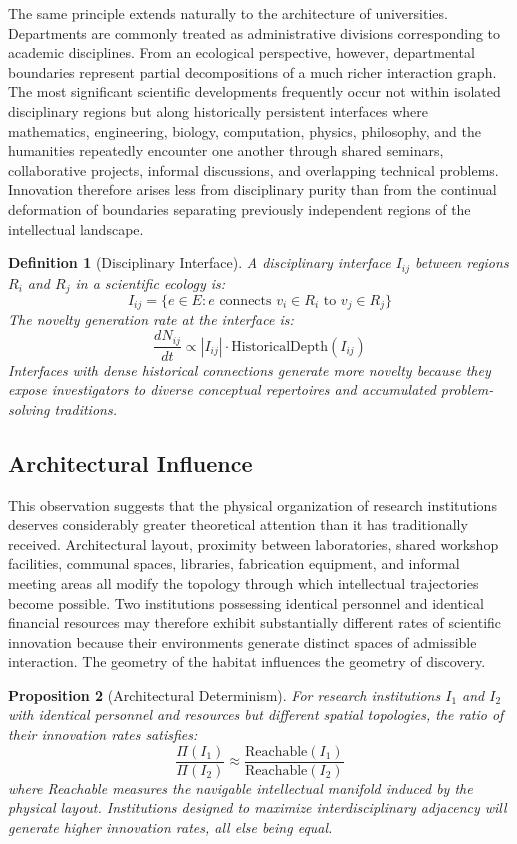 \documentclass[12pt,oneside]{article}
\newtheorem{definition}{Definition}[section]
\newtheorem{proposition}[definition]{Proposition}
\theoremstyle{remark}
\begin{document}
The same principle extends naturally to the architecture of universities. Departments are commonly treated as administrative divisions corresponding to academic disciplines. From an ecological perspective, however, departmental boundaries represent partial decompositions of a much richer interaction graph. The most significant scientific developments frequently occur not within isolated disciplinary regions but along historically persistent interfaces where mathematics, engineering, biology, computation, physics, philosophy, and the humanities repeatedly encounter one another through shared seminars, collaborative projects, informal discussions, and overlapping technical problems. Innovation therefore arises less from disciplinary purity than from the continual deformation of boundaries separating previously independent regions of the intellectual landscape.

\begin{definition}[Disciplinary Interface]
A disciplinary interface \(I_{ij}\) between regions \(R_i\) and \(R_j\) in a scientific ecology is:
\[
I_{ij} = \{e \in E : e \text{ connects } v_i \in R_i \text{ to } v_j \in R_j\}
\]
The novelty generation rate at the interface is:
\[
\frac{dN_{ij}}{dt} \propto |I_{ij}| \cdot \text{HistoricalDepth}(I_{ij})
\]
Interfaces with dense historical connections generate more novelty because they expose investigators to diverse conceptual repertoires and accumulated problem-solving traditions.
\end{definition}

\subsection{Architectural Influence}

This observation suggests that the physical organization of research institutions deserves considerably greater theoretical attention than it has traditionally received. Architectural layout, proximity between laboratories, shared workshop facilities, communal spaces, libraries, fabrication equipment, and informal meeting areas all modify the topology through which intellectual trajectories become possible. Two institutions possessing identical personnel and identical financial resources may therefore exhibit substantially different rates of scientific innovation because their environments generate distinct spaces of admissible interaction. The geometry of the habitat influences the geometry of discovery.

\begin{proposition}[Architectural Determinism]
For research institutions \(I_1\) and \(I_2\) with identical personnel and resources but different spatial topologies, the ratio of their innovation rates satisfies:
\[
\frac{\Pi(I_1)}{\Pi(I_2)} \approx \frac{\text{Reachable}(I_1)}{\text{Reachable}(I_2)}
\]
where Reachable measures the navigable intellectual manifold induced by the physical layout. Institutions designed to maximize interdisciplinary adjacency will generate higher innovation rates, all else being equal.
\end{proposition}
\end{document}
